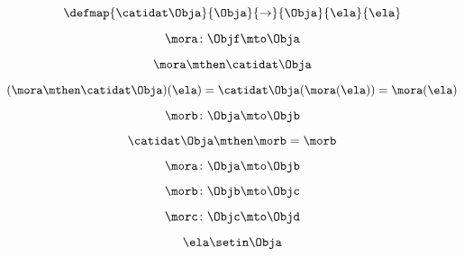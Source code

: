 \begin{forslides}
        
         \begin{equation}
            \label{eq:89}
            \defmap{
            \catidat\Obja
        }{
            \Obja
        }{
            \to
        }{
            \Obja
        }{
            \ela
        }{
            \ela
        }
        \end{equation}
        
        
         \begin{equation}
            \label{eq:90}
            \mora \colon \Objf \mto \Obja
        \end{equation}
        
        
         \begin{equation}
            \label{eq:91}
            \mora \mthen \catidat\Obja
        \end{equation}
        
        
         \begin{equation}
            \label{eq:92}
            (\mora \mthen \catidat\Obja)(\ela)
        = \catidat\Obja(\mora (\ela)) = \mora (\ela)
        \end{equation}
        
        
         \begin{equation}
            \label{eq:93}
            \morb \colon \Obja \mto \Objb
        \end{equation}
        
        
         \begin{equation}
            \label{eq:94}
            \catidat\Obja \mthen \morb = \morb
        \end{equation}
        
        
         \begin{equation}
            \label{eq:95}
            \mora \colon \Obja \mto \Objb
        \end{equation}
        
        
         \begin{equation}
            \label{eq:96}
            \morb\colon \Objb \mto \Objc
        \end{equation}
        
        
         \begin{equation}
            \label{eq:97}
            \morc \colon \Objc \mto \Objd
        \end{equation}
        
        
         \begin{equation}
            \label{eq:98}
            \ela \setin \Obja
        \end{equation}
        

\end{forslides}

